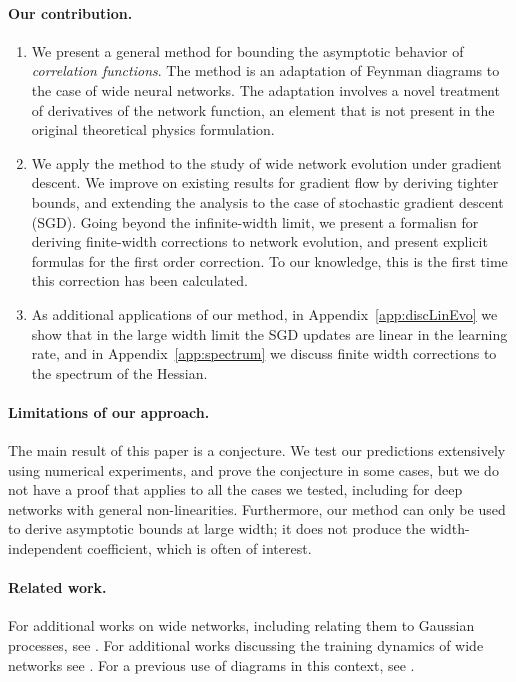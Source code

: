 \documentclass[english]{article}
\newcommand{\pcite}[1]{\cite{#1}}
\begin{document}
\paragraph{Our contribution.}
\begin{enumerate}
\item We present a general method for bounding the asymptotic behavior of \emph{correlation functions}.
  The method is an adaptation of Feynman diagrams to the case of wide neural networks.
  The adaptation involves a novel treatment of derivatives of the network function, an element that is not present in the original theoretical physics formulation.
\item We apply the method to the study of wide network evolution under gradient descent.
  We improve on existing results for gradient flow \pcite{ntk} by deriving tighter bounds, and extending the analysis to the case of stochastic gradient descent (SGD).
  Going beyond the infinite-width limit, we present a formalisn for deriving finite-width corrections to network evolution, and present explicit formulas for the first order correction.
  To our knowledge, this is the first time this correction has been calculated.
\item As additional applications of our method, in Appendix~\ref{app:discLinEvo} we show that in the large width limit the SGD updates are linear in the learning rate, and in Appendix~\ref{app:spectrum} we discuss finite width corrections to the spectrum of the Hessian.
\end{enumerate}

\paragraph{Limitations of our approach.} 
The main result of this paper is a conjecture.
We test our predictions extensively using numerical experiments, and prove the conjecture in some cases, but we do not have a proof that applies to all the cases we tested, including for deep networks with general non-linearities.
Furthermore, our method can only be used to derive asymptotic bounds at large width; it does not produce the width-independent coefficient, which is often of interest.

\paragraph{Related work.}
For additional works on wide networks, including relating them to Gaussian processes, see \cite{g.2018gaussian, novak2019bayesian, garriga-alonso2018deep, yang2019scaling, pennington2017geometry, pennington2018spectrum, schoenholz2017correspondence, xiao2018dynamical, chen2018dynamical, daniely2016toward, 2019arXiv190206720L, du2018gradient, du2018gradient2, allen2018convergence}.
For additional works discussing the training dynamics of wide networks see \cite{geiger2019scaling, arora2019fine}.
For a previous use of diagrams in this context, see \cite{NIPS2017_6857}. 
\end{document}
